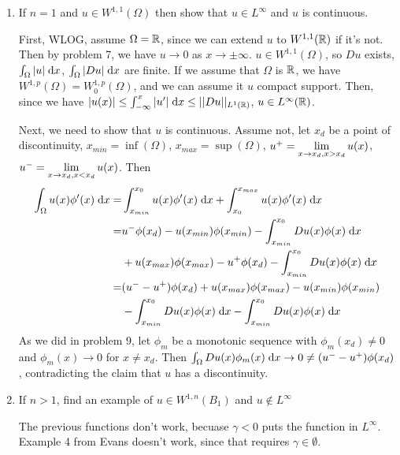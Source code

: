 \begin{enumerate}
\item
  If $n = 1$ and $u \in W^{1, 1}(\Omega)$ then show that $u \in L^\infty$ and $u$ is continuous.

  First, WLOG, assume $\Omega = \mathbb{R}$, since we can extend $u$ to $W^{1, 1}(\mathbb{R})$ if it's not.
  Then by problem 7, we have $u \rightarrow 0$ as $x \rightarrow \pm \infty$.
  $u \in W^{1, 1}(\Omega)$, so $D u$ exists, $\int_\Omega |u| \;\mathrm{d}x$, $\int_\Omega |D u| \;\mathrm{d}x$ are finite.
  If we assume that $\Omega$ is $\mathbb{R}$, we have $W^{1, p}(\Omega) = W^{1, p}_0(\Omega)$,
  and we can assume it $u$ compact support.
  Then, since we have $|u(x)| \leq \int_{-\infty}^x |u'| \;\mathrm{d}x \leq ||D u||_{L^1(\mathbb{R})}$, $u \in L^\infty(\mathbb{R})$.

  Next, we need to show that $u$ is continuous.
  Assume not, let $x_d$ be a point of discontinuity, $x_{min} = \inf(\Omega)$, $x_{max} = \sup(\Omega)$,
  $u^+ = \lim \limits_{x \rightarrow x_d, x > x_d} u(x)$, $u^- = \lim \limits_{x \rightarrow x_d, x < x_d} u(x)$.
  Then
  \begin{align*}
    \int_{\Omega} u(x) \phi'(x) \;\mathrm{d}x = &\int_{x_{min}}^{x_0} u(x) \phi'(x) \;\mathrm{d}x + \int_{x_0}^{x_{max}} u(x) \phi'(x) \;\mathrm{d}x\\
                                   = &u^- \phi(x_d) - u(x_{min}) \phi(x_{min}) - \int_{x_{min}}^{x_0} D u(x) \phi(x) \;\mathrm{d}x\\
                                      &+ u(x_{max}) \phi(x_{max}) - u^+ \phi(x_{d}) - \int_{x_{min}}^{x_0} D u(x) \phi(x) \;\mathrm{d}x\\
                                   = &(u^- - u^+) \phi(x_d) + u(x_{max}) \phi(x_{max}) - u(x_{min}) \phi(x_{min})\\
                                      &- \int_{x_{min}}^{x_0} D u(x) \phi(x) \;\mathrm{d}x - \int_{x_{min}}^{x_0} D u(x) \phi(x) \;\mathrm{d}x
  \end{align*}
  As we did in problem 9, let $\phi_m$ be a monotonic sequence with $\phi_m(x_d) \neq 0$
  and $\phi_m(x) \rightarrow 0$ for $x \neq x_d$.
  Then $\int_\Omega D u(x) \phi_m(x) \;\mathrm{d}x \rightarrow 0 \neq (u^- - u^+) \phi(x_d)$,
  contradicting the claim that $u$ has a discontinuity.

\item
  If $n > 1$, find an example of $u \in W^{1, n}(B_1)$ and $u \notin L^\infty$

  The previous functions don't work, becuase $\gamma < 0$ puts the function in $L^\infty$.
  Example 4 from Evans doesn't work, since that requires $\gamma \in \emptyset$.

\end{enumerate}
